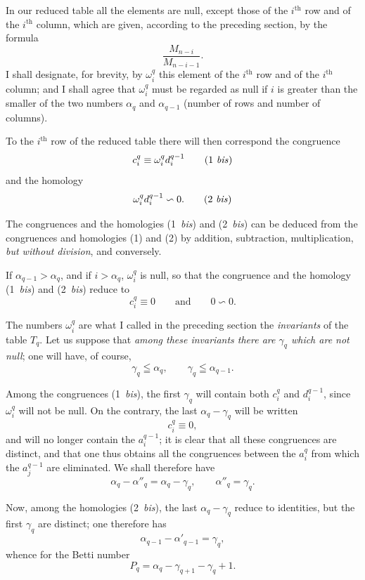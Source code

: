 \documentclass{article}
\begin{document}
In our reduced table all the elements are null, except those of the $i^{\text{th}}$ row and of the $i^{\text{th}}$ column, which are given, according to the preceding section, by the formula
\[ \frac{M_{n-i}}{M_{n-i-1}}. \]
I shall designate, for brevity, by $\omega^{q}_{i}$ this element of the $i^{\text{th}}$ row and of the $i^{\text{th}}$ column; and I shall agree that $\omega^{q}_{i}$ must be regarded as null if $i$ is greater than the smaller of the two numbers $\alpha_{q}$ and $\alpha_{q-1}$ (number of rows and number of columns).

To the $i^{\text{th}}$ row of the reduced table there will then correspond the congruence
\[ c^{q}_{i} \equiv \omega^{q}_{i} d^{q-1}_{i} \tag{1 \textit{bis}} \]
and the homology
\[ \omega^{q}_{i} d^{q-1}_{i} \backsim 0. \tag{2 \textit{bis}} \]

The congruences and the homologies (1~\emph{bis}) and (2~\emph{bis}) can be deduced from the congruences and homologies (1) and (2) by addition, subtraction, multiplication, \emph{but without division}, and conversely.

If $\alpha_{q-1} > \alpha_{q}$, and if $i > \alpha_{q}$, $\omega^{q}_{i}$ is null, so that the congruence and the homology (1~\emph{bis}) and (2~\emph{bis}) reduce to
\[ c^{q}_{i} \equiv 0 \qquad \text{and} \qquad 0 \backsim 0. \]

The numbers $\omega^{q}_{i}$ are what I called in the preceding section the \emph{invariants} of the table $T_{q}$. Let us suppose that \emph{among these invariants there are $\gamma_{q}$ which are not null}; one will have, of course,
\[ \gamma_{q} \leqq \alpha_{q}, \qquad \gamma_{q} \leqq \alpha_{q-1}. \]

Among the congruences (1~\emph{bis}), the first $\gamma_{q}$ will contain both $c^{q}_{i}$ and $d^{q-1}_{i}$, since $\omega^{q}_{i}$ will not be null. On the contrary, the last $\alpha_{q} - \gamma_{q}$ will be written
\[ c^{q}_{i} \equiv 0, \]
and will no longer contain the $a^{q-1}_{i}$; it is clear that all these congruences are distinct, and that one thus obtains all the congruences between the $a^{q}_{i}$ from which the $a^{q-1}_{j}$ are eliminated. We shall therefore have
\[ \alpha_{q} - \alpha''_{q} = \alpha_{q} - \gamma_{q}, \qquad \alpha''_{q} = \gamma_{q}. \]

Now, among the homologies (2~\emph{bis}), the last $\alpha_{q} - \gamma_{q}$ reduce to identities, but the first $\gamma_{q}$ are distinct; one therefore has
\[ \alpha_{q-1} - \alpha'_{q-1} = \gamma_{q}, \]
whence for the Betti number
\[ P_{q} = \alpha_{q} - \gamma_{q+1} - \gamma_{q} + 1. \]
\end{document}
